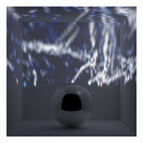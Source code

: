 \begin{figure}[]
\begin{subfigure}{\textwidth}
\begin{subfigure}{0.19\textwidth}
            \caption*{}
        \end{subfigure}
        \hfill
        \begin{subfigure}{0.19\textwidth}
            \centering
            \includegraphics[width=\textwidth]{images/04-experiment03/ball_dof/marble/pixel_proj.jpg}
            \caption*{}
        \end{subfigure}


\end{subfigure}
\end{figure}
